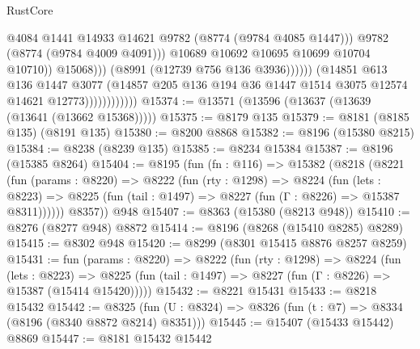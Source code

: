 \begin{lexlean}{RustCore}
\begin{coremodule}
                                              @4084
                                              @1441
                                              @14933
                                              @14621
                                              @9782
                                              (@8774 (@9784 @4085 @1447)))
                                            @9782
                                            (@8774 (@9784 @4009 @4091)))
                                          @10689
                                          @10692
                                          @10695
                                          @10699
                                          @10704
                                          @10710))
                                      @15068)))
                                (@8991 (@12739 @756 @136 @3936))))))
                        (@14851
                          @613
                          @136
                          @1447
                          @3077
                          (@14857
                            @205
                            @136
                            @194
                            @36
                            @1447
                            @1514
                            @3075
                            @12574
                            @14621
                            @12773))))))))))))
@15374 := @13571 (@13596 (@13637 (@13639 (@13641 (@13662 @15368)))))
@15375 := @8179 @135
@15379 := @8181 (@8185 @135) (@8191 @135)
@15380 := @8200 @8868
@15382 := @8196 (@15380 @8215)
@15384 := @8238 (@8239 @135)
@15385 := @8234 @15384
@15387 := @8196 (@15385 @8264)
@15404 := @8195
    (fun (fn : @116) =>
    @15382
      (@8218
        (@8221
          (fun (params : @8220) =>
          @8222
            (fun (rty : @1298) =>
            @8224
              (fun (lets : @8223) =>
              @8225 (fun (tail : @1497) => @8227 (fun (Γ : @8226) => @15387 @8311))))))
        @8357))
    @948
@15407 := @8363 (@15380 (@8213 @948))
@15410 := @8276 (@8277 @948) @8872
@15414 := @8196 (@8268 (@15410 @8285) @8289)
@15415 := @8302 @948
@15420 := @8299 (@8301 @15415 @8876 @8257 @8259)
@15431 := fun (params : @8220) =>
  @8222
    (fun (rty : @1298) =>
    @8224
      (fun (lets : @8223) =>
      @8225 (fun (tail : @1497) => @8227 (fun (Γ : @8226) => @15387 (@15414 @15420)))))
@15432 := @8221 @15431
@15433 := @8218 @15432
@15442 := @8325 (fun (U : @8324) => @8326 (fun (t : @7) => @8334 (@8196 (@8340 @8872 @8214) @8351)))
@15445 := @15407 (@15433 @15442) @8869
@15447 := @8181 @15432 @15442

\end{coremodule}
\end{lexlean}
